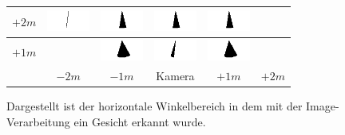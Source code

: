 \begin{figure}
\begin{tabular}{|c|c|c|c|c|c|}
		\hline 
		$+2m$ & \includegraphics[width=1.4cm]{PositionWinkel/Winkel_-200_200.png} &
		\includegraphics[width=1.4cm]{PositionWinkel/Winkel_-100_200.png} &
		\includegraphics[width=1.4cm]{PositionWinkel/Winkel_0_200.png} &
		\includegraphics[width=1.4cm]{PositionWinkel/Winkel_100_200.png} & \\ 
		\hline 
		$+1m$ & &
		\includegraphics[width=1.4cm]{PositionWinkel/Winkel_-100_100.png} &
		\includegraphics[width=1.4cm]{PositionWinkel/Winkel_0_100.png} &
		\includegraphics[width=1.4cm]{PositionWinkel/Winkel_100_100.png} & \\ 
		\hline 
		& $-2m$ & $-1m$ &Kamera& $+1m$ & $+2m$ \\ 
		\hline 
	\end{tabular}
	\caption{Dargestellt ist der horizontale Winkelbereich in dem mit der Image-Verarbeitung ein Gesicht erkannt wurde.}
	\label{graph_Test_Bilder}
\end{figure}
